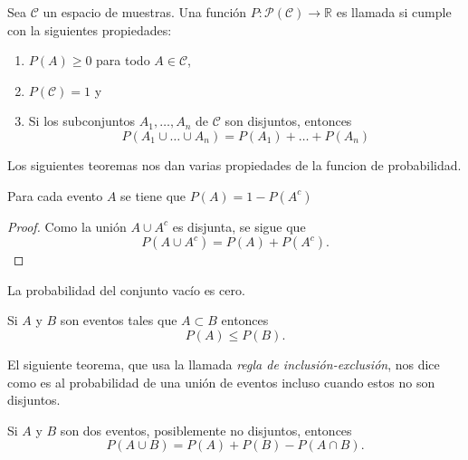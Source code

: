 \begin{defi}
	Sea $\mathcal{C}$ un espacio de muestras. Una función $P\colon\mathcal{P}(\mathcal{C})\to\mathbb{R}$ es llamada  si cumple con la siguientes propiedades:
	\begin{enumerate}
		\item $P(A)\geq0$ para todo $A\in\mathcal{C}$,
		\item $P(\mathcal{C})=1$  y
		\item Si los subconjuntos $A_1,\dots,A_n$ de $\mathcal{C}$ son disjuntos, entonces
			\[ P(A_1\cup\dots\cup A_n)=P(A_1)+\dots+P(A_n) \]
	\end{enumerate}
\end{defi}

\noindent
Los siguientes teoremas nos dan varias propiedades de la funcion de probabilidad.

\begin{teo}
	Para cada evento $A$ se tiene que $P(A)=1-P(A^c)$
\end{teo}
\begin{proof}
	Como la unión $A\cup A^c$ es disjunta, se sigue que
	\[
		P(A\cup A^c)=P(A)+P(A^c).
	\]
\end{proof}
\begin{teo}
	La probabilidad del conjunto vacío es cero.
\end{teo}
\begin{teo}
	Si $A$ y $B$ son eventos tales que $A\subset B$ entonces
	\[
		P(A)\leq P(B).
	\]
\end{teo}

El siguiente teorema, que usa la llamada \emph{regla de inclusión-exclusión}, nos dice como es al probabilidad de una unión de eventos incluso cuando estos no son disjuntos.

\begin{teo}
	Si $A$ y $B$ son dos eventos, posiblemente no disjuntos, entonces
	\[
		P(A\cup B) = P(A)+P(B)-P(A\cap B).
	\]
\end{teo}
